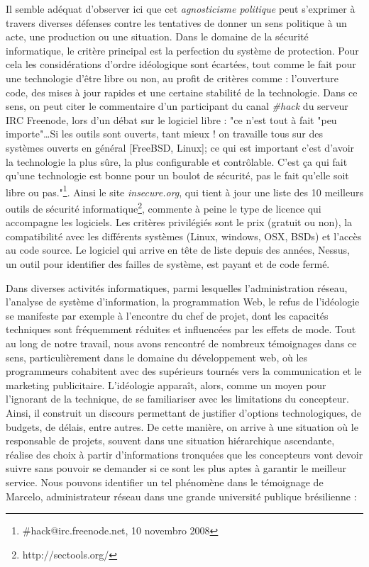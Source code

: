 Il semble adéquat d'observer ici que cet \emph{agnosticisme politique} peut s'exprimer à travers diverses défenses contre les tentatives de donner un sens politique à un acte, une production ou une situation. Dans le domaine de la sécurité informatique, le critère principal est la perfection du système de protection. Pour cela les considérations d'ordre idéologique sont écartées, tout comme le fait pour une technologie d'être libre ou non, au profit de critères comme : l'ouverture code, des mises à jour rapides et une certaine stabilité de la technologie. Dans ce sens, on peut citer le commentaire d'un participant du canal \emph{\#hack} du serveur IRC Freenode, lors d'un débat sur le logiciel libre : "ce n'est tout à fait "peu importe"\ldots Si les outils sont ouverts, tant mieux ! on travaille tous sur des systèmes ouverts en général [FreeBSD, Linux]; ce qui est important c'est d'avoir la technologie la plus sûre, la plus configurable et contrôlable. C'est ça qui fait qu'une technologie est bonne pour un boulot de sécurité, pas le fait qu'elle soit libre ou pas."\footnote{\#hack@irc.freenode.net, 10 novembro 2008}. Ainsi le site \emph{insecure.org}, qui tient à jour une liste des 10 meilleurs outils de sécurité informatique\footnote{http://sectools.org/}, commente à peine le type de licence qui accompagne les logiciels. Les critères privilégiés sont le prix (gratuit ou non), la compatibilité avec les différents systèmes (Linux, windows, OSX, BSDs) et l'accès au code source. Le logiciel qui arrive en tête de liste depuis des années, Nessus, un outil pour identifier des failles de système, est payant et de code fermé.

Dans diverses activités informatiques, parmi lesquelles l'administration réseau, l'analyse de système d'information, la programmation Web, le refus de l'idéologie se manifeste par exemple à l'encontre du chef de projet, dont les capacités techniques sont fréquemment réduites et influencées par les effets de mode. Tout au long de notre travail, nous avons rencontré de nombreux témoignages dans ce sens, particulièrement dans le domaine du développement web, où les programmeurs cohabitent avec des supérieurs tournés vers la communication et le marketing publicitaire. L'idéologie apparaît, alors, comme un moyen pour l'ignorant de la technique, de se familiariser avec les limitations du concepteur. Ainsi, il construit un discours permettant de justifier d'options technologiques, de budgets, de délais, entre autres. De cette manière, on arrive à une situation où le responsable de projets, souvent dans une situation hiérarchique ascendante, réalise des choix à partir d'informations tronquées que les concepteurs vont devoir suivre sans pouvoir se demander si ce sont les plus aptes à garantir le meilleur service. Nous pouvons identifier un tel phénomène dans le témoignage de Marcelo, administrateur réseau dans une grande université publique brésilienne :

